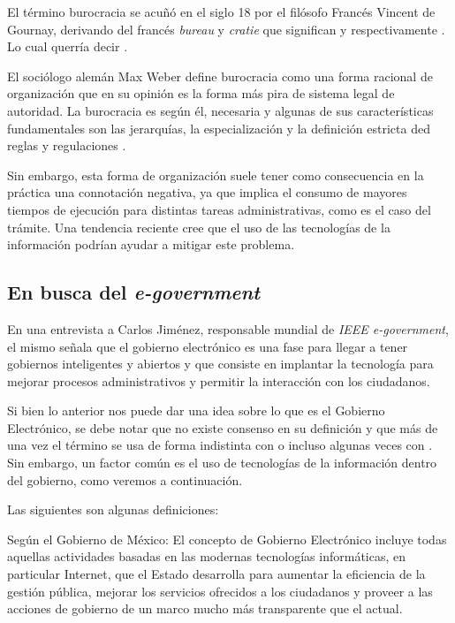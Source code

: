 El término burocracia se acuñó en el siglo 18 por el filósofo Francés Vincent de
Gournay, derivando del francés \textit{bureau} y \textit{cratie} que significan
 y  respectivamente
\cite{britannicabureaucracy}. Lo cual querría decir .

El sociólogo alemán Max Weber define burocracia como una forma racional de
organización que en su opinión es la forma más pira de sistema legal de
autoridad. La burocracia es según él, necesaria y algunas de sus características
fundamentales son las jerarquías, la especialización y la definición estricta
ded reglas y regulaciones \cite{brajnikdictionaryofpublicadmin}.

Sin embargo, esta forma de organización suele tener como consecuencia en la
práctica una connotación negativa, ya que implica el consumo de mayores tiempos
de ejecución para distintas tareas administrativas, como es el caso del trámite.
Una tendencia reciente cree que el uso de las tecnologías de la información
podrían ayudar a mitigar este problema.

\subsection{En busca del \textit{e-government}}

En una entrevista a Carlos Jiménez, responsable mundial de \textit{IEEE e-government}, el mismo señala que el gobierno electrónico es una fase para llegar a tener gobiernos inteligentes y abiertos y que consiste en implantar la tecnología para mejorar procesos administrativos y permitir la interacción con los ciudadanos.

Si bien lo anterior nos puede dar una idea sobre lo que es el Gobierno Electrónico, se debe notar que no existe consenso en su definición y que más de una vez el término se usa de forma indistinta con  o incluso algunas veces con . Sin embargo, un factor común es el uso de tecnologías de la información dentro del gobierno, como veremos a continuación.

Las siguientes son algunas definiciones:

Según el Gobierno de México: El concepto de Gobierno Electrónico incluye todas aquellas actividades basadas en las modernas tecnologías informáticas, en particular Internet, que el Estado desarrolla para aumentar la eficiencia de la gestión pública, mejorar los servicios ofrecidos a los ciudadanos y proveer a las acciones de gobierno de un marco mucho más transparente que el actual.

